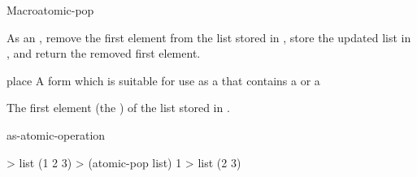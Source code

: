 \documentclass[10pt,twoside,english,pdftex]{article}
\begin{document}

\begin{functiondoc}{Macro}{atomic-pop}{ \returns{}
    }
%

\fnsyntax

\fnpurpose As an , remove the first element
from the list stored in , store the updated list in
, and return the removed first element.

\fnpackage {}

\fnmodule {}

\fnargs
\begin{args}{place}
\arg[place] A form which is suitable for use as a
   that contains a  or
   a 
\end{args}

\fnreturns The first element (the ) of the list stored in
.

\begin{alsos}{as-atomic-operation}
\end{alsos}

\fnexample
\begin{example}
> list
(1 2 3)
> (atomic-pop list)
1
> list
(2 3)
\end{example}

\end{functiondoc}

\end{document}
